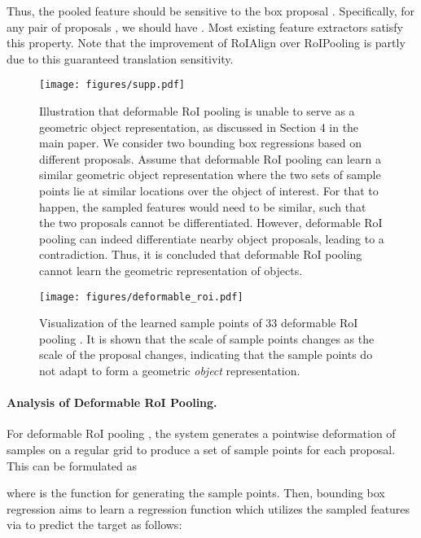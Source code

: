 \documentclass[10pt,twocolumn,letterpaper]{article}
\begin{document}
Thus, the pooled feature  should be sensitive to the box proposal . Specifically, for any pair of proposals , we should have . Most existing feature extractors  satisfy this property. Note that the improvement of RoIAlign \cite{Mask-rcnn} over RoIPooling \cite{ren2015faster} is partly due to this guaranteed translation sensitivity.


\begin{figure}
    \centering
    \texttt{[image: figures/supp.pdf]}
\caption{Illustration that deformable RoI pooling \cite{DCN} is unable to serve as a geometric object representation, as discussed in Section 4 in the main paper. We consider two bounding box regressions based on different proposals. Assume that deformable RoI pooling \cite{DCN} can learn a similar geometric object representation where the two sets of sample points lie at similar locations over the object of interest. For that to happen, the sampled features would need to be similar, such that the two proposals cannot be differentiated. However, deformable RoI pooling
\cite{DCN} can indeed differentiate nearby object proposals, leading to a contradiction. Thus, it is concluded that deformable RoI pooling \cite{DCN} cannot learn the geometric representation of objects. }
    \label{fig::dpool_bug}
\end{figure}
 \begin{figure}
    \centering
    \texttt{[image: figures/deformable\_roi.pdf]}
    \caption{Visualization of the learned sample points of 33 deformable RoI pooling \cite{DCN}. It is shown that the scale of sample points changes as the scale of the proposal changes, indicating that the sample points do not adapt to form a geometric \emph{object} representation.}
    \label{fig::dpool_demo}
\end{figure}
 
\paragraph{Analysis of Deformable RoI Pooling.}
For deformable RoI pooling \cite{DCN}, the system generates a pointwise deformation of samples on a regular grid \cite{Mask-rcnn} to produce a set of sample points  for each proposal. This can be formulated as

where  is the function for generating the sample points. Then, bounding box regression aims to learn a regression function  which utilizes the sampled features via  to predict the target  as follows:
\end{document}
